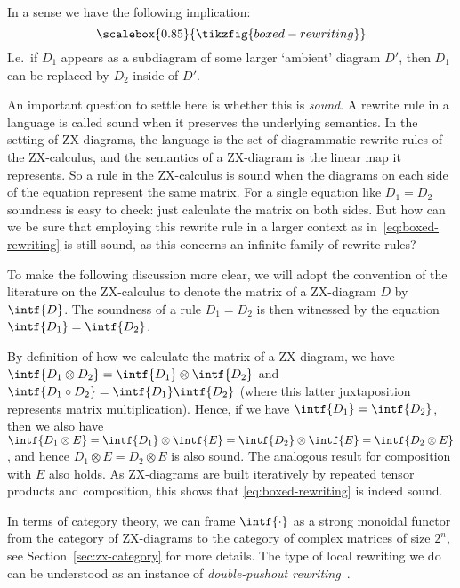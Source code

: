 \documentclass[a4paper,onecolumn,superscriptaddress,11pt,%
				unpublished,%
				allowfontchageintitle,%
				]{quantumarticle}
\begin{document}
In a sense we have the following implication:
\begin{equation}\label{eq:boxed-rewriting}
	\scalebox{0.85}{\tikzfig{boxed-rewriting}}
\end{equation}
I.e.~if $D_1$ appears as a subdiagram of some larger `ambient' diagram $D'$, then $D_1$ can be replaced by $D_2$ inside of $D'$. 

An important question to settle here is whether this is \emph{sound}. A rewrite rule in a language is called sound when it preserves the underlying semantics. In the setting of ZX-diagrams, the language is the set of diagrammatic rewrite rules of the ZX-calculus, and the semantics of a ZX-diagram is the linear map it represents. So a rule in the ZX-calculus is sound when the diagrams on each side of the equation represent the same matrix. For a single equation like $D_1=D_2$ soundness is easy to check: just calculate the matrix on both sides. But how can we be sure that employing this rewrite rule in a larger context as in~\eqref{eq:boxed-rewriting} is still sound, as this concerns an infinite family of rewrite rules?

To make the following discussion more clear, we will adopt the convention of the literature on the ZX-calculus to denote the matrix of a ZX-diagram $D$ by $\intf{D}$. The soundness of a rule $D_1=D_2$ is then witnessed by the equation $\intf{D_1}=\intf{D_2}$.

By definition of how we calculate the matrix of a ZX-diagram, we have $\intf{D_1\otimes D_2} = \intf{D_1}\otimes \intf{D_2}$ and $\intf{D_1\circ D_2} = \intf{D_1}\intf{D_2}$ (where this latter juxtaposition represents matrix multiplication).
Hence, if we have $\intf{D_1}=\intf{D_2}$, then we also have $\intf{D_1\otimes E} = \intf{D_1}\otimes \intf{E} = \intf{D_2}\otimes \intf{E} = \intf{D_2\otimes E}$, and hence $D_1\otimes E = D_2\otimes E$ is also sound. The analogous result for composition with $E$ also holds. 
As ZX-diagrams are built iteratively by repeated tensor products and composition, this shows that \eqref{eq:boxed-rewriting} is indeed sound.

In terms of category theory, we can frame $\intf{\cdot}$ as a strong monoidal functor from the category of ZX-diagrams to the category of complex matrices of size $2^n$, see Section~\ref{sec:zx-category} for more details. The type of local rewriting we do can be understood as an instance of \emph{double-pushout rewriting}~\cite{bonchi2020string}.
\end{document}
